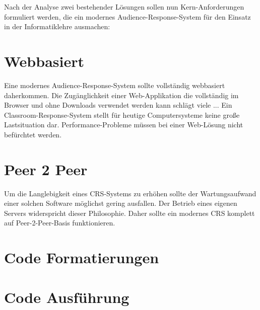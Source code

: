 Nach der Analyse zwei bestehender Lösungen sollen nun Kern-Anforderungen formuliert werden, die ein modernes Audience-Response-System für den Einsatz in der Informatiklehre ausmachen:

\section{Webbasiert}
\label{chap:webbasiert}
Eine modernes Audience-Response-System sollte vollständig webbasiert daherkommen. Die Zugänglichkeit einer Web-Applikation die vollständig im Browser und ohne Downloads verwendet werden kann schlägt viele ...
Ein Classroom-Response-System stellt für heutige Computersysteme keine große Lastsituation dar. Performance-Probleme müssen bei einer Web-Lösung nicht befürchtet werden.
\section{Peer 2 Peer}
\label{chap:p2p}
Um die Langlebigkeit eines CRS-Systems zu erhöhen sollte der Wartungsaufwand einer solchen Software möglichst gering ausfallen. Der Betrieb eines eigenen Servers widerspricht dieser Philosophie. Daher sollte ein modernes CRS komplett auf Peer-2-Peer-Basis funktionieren.

\section{Code Formatierungen}
\label{chap:codeformatierung}

\section{Code Ausführung}
\label{chap:codeausfuehrung}
